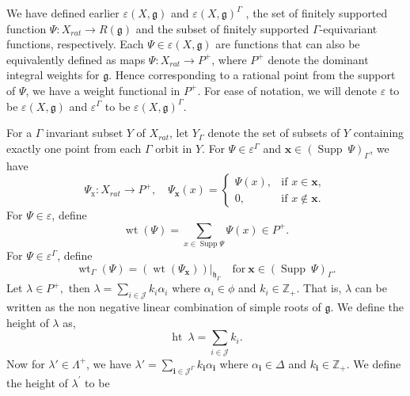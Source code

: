 \documentclass[11pt]{amsart}
\theoremstyle{plain}
\theoremstyle{definition}
\newcommand{\g}{\mathfrak{g}}
\newcommand{\h}{\mathfrak{h}}
\DeclareMathOperator{\Supp}{Supp}
\DeclareMathOperator{\het}{ht}
\DeclareMathOperator{\wt}{wt}
\begin{document}
We have defined earlier 
$\varepsilon(X,\g)$ and $\varepsilon(X,\g)^{\Gamma}$ \label{pg:10}, the set of finitely supported function  $\Psi:X_{rat}\rightarrow R(\g)$ and the subset of finitely supported $\Gamma$-equivariant functions, respectively. Each $\Psi\in\varepsilon(X,\g)$ are functions that can also be equivalently defined as maps $\Psi:X_{rat}\rightarrow P^{+}$, where $P^{+}$ denote the dominant integral weights for $\g$. Hence corresponding to a rational point from the support of $\Psi$, we have a weight functional in $P^+$. For ease of notation, we will denote $\varepsilon$ to be $\varepsilon(X,\g)$ and $\varepsilon^{\Gamma}$ to be $\varepsilon(X,\g)^{\Gamma}$. 

For a $\Gamma$ invariant subset $Y$ of $X_{rat}$, let $Y_{\Gamma}$ \label{pg:11} denote the set of subsets of $Y$ containing exactly one point from each $\Gamma$ orbit in $Y$. For $\Psi\in\varepsilon^{\Gamma}$ and $\mathbf{x}\in (\Supp\ \Psi)_{\Gamma}$, we have
\begin{equation*}
    \Psi_{\mbox{x}}:X_{rat}\rightarrow P^{+}, \quad \Psi_{\mathbf{x}}(x)= \begin{cases}
    \Psi(x), & \text{if } x \in \mathbf{x}, \\
0, & \text{if } x \notin \mathbf{x}.

    \end{cases}
\end{equation*}
For $\Psi\in\varepsilon$, define
\begin{equation*}
    \wt(\Psi)=\sum_{x\in \Supp\Psi}\Psi(x)\in P^{+}.
\end{equation*}
For $\Psi\in\varepsilon^{\Gamma}$, define
\begin{equation*}
    \wt_{\Gamma}(\Psi)=(\wt(\Psi_{\mathbf{x}}))|_{\h_{\Gamma}} \quad \mbox{for}~\mathbf{x}\in (\Supp\ \Psi)_{\Gamma}.
\end{equation*}
Let $\lambda\in P^{+},$ then $\lambda=\sum_{i\in\mathcal{J}}k_{i}\alpha_{i}$ where $\alpha_{i}\in\phi$ and $k_{i}\in\mathbb{Z}_{+}$. That is, $\lambda$ can be written as the non negative linear combination of simple  roots of $\g$. We define the height of $\lambda$ as,\label{pg:13}
\begin{equation*}
    \het\ \lambda=\sum_{i\in\mathcal{J}}k_{i}.
\end{equation*}
Now for $\lambda'\in \Lambda^{+}$, we have $\lambda'=\sum_{\textbf{i}\in\mathcal{J}^{\Gamma}}k_{\textbf{i}}\alpha_{\textbf{i}}$ where $\alpha_{\textbf{i}}\in\Delta$ and  $k_{\textbf{i}}\in\mathbb{Z}_{+}.$ We define the height of $\lambda^{'}$ to be
\end{document}
